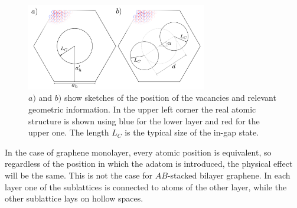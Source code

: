 \begin{figure}[h!]
\centering
\includegraphics[width=0.7\textwidth]{artlat/fig/vacs_sketch.pdf}
\vspace{-10pt}
\caption{$a)$ and $b)$ show sketches of the position of the vacancies and relevant geometric information. In the upper left corner the real atomic structure is shown using blue for the lower layer and red for the upper one. The length $L_C$ is the typical size of the in-gap state.} %
\label{geo_sketch}
\end{figure}
In the case of graphene monolayer, every atomic position is equivalent, so regardless of the position in which the adatom is introduced, the physical effect will be the same.
This is not the case for $AB$-stacked bilayer graphene. In each layer one of the sublattices is connected to atoms of the other layer, while the other sublattice lays on hollow spaces.

